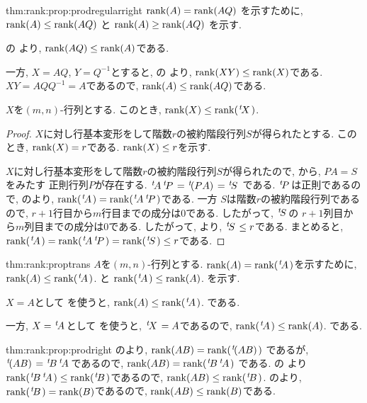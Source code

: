 \begin{proofof*}{thm:rank:prop:prod}{regularright}
   $\operatorname{rank}(A)=\operatorname{rank}(AQ)$
  を示すために,
   $\operatorname{rank}(A)\leq\operatorname{rank}(AQ)$
  と
   $\operatorname{rank}(A)\geq\operatorname{rank}(AQ)$
  を示す.
  
  の
  より, $\operatorname{rank}(AQ)\leq \operatorname{rank}(A)$である.
  
  一方, 
  $X=AQ$, $Y=Q^{-1}$とすると,
  の
  より, $\operatorname{rank}(XY)\leq \operatorname{rank}(X)$である.
  $XY=AQQ^{-1}=A$であるので,
  $\operatorname{rank}(A)\leq\operatorname{rank}(AQ)$である.
\end{proofof*}

\begin{lemma}
  \label{lem:ineq:transrank}
  $X$を$(m,n)$-行列とする.
  このとき, $\operatorname{rank}(X)\leq \operatorname{rank}({\left.^{t}\!X\right.})$.
\end{lemma}
\begin{proof}
  $X$に対し行基本変形をして階数$r$の被約階段行列$S$が得られたとする.
  このとき, $\operatorname{rank}(X)=r$である.
  $\operatorname{rank}(X)\leq r$を示す.

  $X$に対し行基本変形をして階数$r$の被約階段行列$S$が得られたので,
  から,
  $PA=S$をみたす
  正則行列$P$が存在する.
  ${\left.^{t}\!A\right.}{\left.^{t}\!P\right.}={\left.^{t}\!(PA)\right.}={\left.^{t}\!S\right.}$
  である.
  ${\left.^{t}\!P\right.}$は正則であるので,
  のより,
  $\operatorname{rank}({\left.^{t}\!A\right.})=\operatorname{rank}({\left.^{t}\!A\right.}{\left.^{t}\!P\right.})$である.
  一方
  $S$は階数$r$の被約階段行列であるので,
  $r+1$行目から$m$行目までの成分は$0$である.
  したがって,
  ${\left.^{t}\!S\right.}$の
  $r+1$列目から$m$列目までの成分は$0$である.
  したがって,
  より,
  ${\left.^{t}\!S\right.}\leq r$である.
  まとめると,
  $\operatorname{rank}({\left.^{t}\!A\right.})=\operatorname{rank}({\left.^{t}\!A\right.}{\left.^{t}\!P\right.})=\operatorname{rank}({\left.^{t}\!S\right.})\leq r$である.
\end{proof}
\begin{proofof*}{thm:rank:prop}{trans}
  $A$を$(m,n)$-行列とする.
  $\operatorname{rank}(A)=\operatorname{rank}({\left.^{t}\!A\right.})$を示すために,
  $\operatorname{rank}(A)\leq\operatorname{rank}({\left.^{t}\!A\right.})$.
  と
  $\operatorname{rank}({\left.^{t}\!A\right.})\leq \operatorname{rank}(A)$.
  を示す.
  
  $X=A$として
  を使うと,
  $\operatorname{rank}(A)\leq\operatorname{rank}({\left.^{t}\!A\right.})$.
  である.

  一方,
  $X={\left.^{t}\!A\right.}$として
  を使うと,
  ${\left.^{t}\!X\right.}=A$であるので,
  $\operatorname{rank}({\left.^{t}\!A\right.})\leq \operatorname{rank}(A)$.
  である.
  
\end{proofof*}
\begin{proofof*}{thm:rank:prop:prod}{right}
  のより,
  $\operatorname{rank}(AB)=\operatorname{rank}({\left.^{t}\!(AB)\right.})$
  であるが, ${\left.^{t}\!(AB)\right.}={\left.^{t}\!B\right.}{\left.^{t}\!A\right.}$であるので,
  $\operatorname{rank}(AB)=\operatorname{rank}({\left.^{t}\!B\right.}{\left.^{t}\!A\right.})$
  である.
  の
  より$\operatorname{rank}({\left.^{t}\!B\right.}{\left.^{t}\!A\right.})\leq\operatorname{rank}({\left.^{t}\!B\right.})$であるので,
  $\operatorname{rank}(AB)\leq\operatorname{rank}({\left.^{t}\!B\right.})$.
  のより,
  $\operatorname{rank}({\left.^{t}\!B\right.})=\operatorname{rank}(B)$であるので,
  $\operatorname{rank}(AB)\leq \operatorname{rank}(B)$である.
\end{proofof*}

